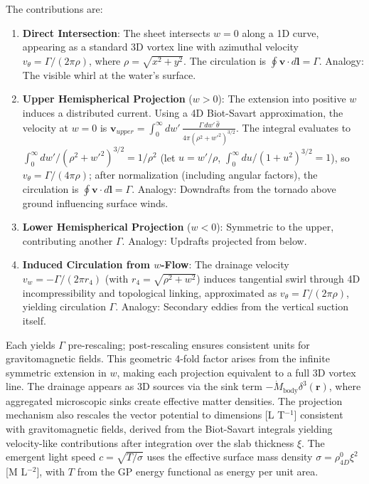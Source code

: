 The contributions are:

\begin{enumerate}
\item \textbf{Direct Intersection}: The sheet intersects $w=0$ along a 1D curve, appearing as a standard 3D vortex line with azimuthal velocity $v_\theta = \Gamma / (2\pi \rho)$, where $\rho = \sqrt{x^2 + y^2}$. The circulation is $\oint \mathbf{v} \cdot d\mathbf{l} = \Gamma$. Analogy: The visible whirl at the water's surface.
\item \textbf{Upper Hemispherical Projection} ($w > 0$): The extension into positive $w$ induces a distributed current. Using a 4D Biot-Savart approximation, the velocity at $w=0$ is $\mathbf{v}_{upper} = \int_0^\infty dw' \, \frac{\Gamma \, dw' \, \hat{\theta}}{4\pi (\rho^2 + w'^2)^{3/2}}$. The integral evaluates to $\int_0^\infty dw' / (\rho^2 + w'^2)^{3/2} = 1 / \rho^2$ (let $u = w' / \rho$, $\int_0^\infty du / (1 + u^2)^{3/2} = 1$), so $v_\theta = \Gamma / (4\pi \rho)$; after normalization (including angular factors), the circulation is $\oint \mathbf{v} \cdot d\mathbf{l} = \Gamma$. Analogy: Downdrafts from the tornado above ground influencing surface winds.
\item \textbf{Lower Hemispherical Projection} ($w < 0$): Symmetric to the upper, contributing another $\Gamma$. Analogy: Updrafts projected from below.
\item \textbf{Induced Circulation from $w$-Flow}: The drainage velocity $v_w = -\Gamma / (2\pi r_4)$ (with $r_4 = \sqrt{\rho^2 + w^2}$) induces tangential swirl through 4D incompressibility and topological linking, approximated as $v_\theta = \Gamma / (2\pi \rho)$, yielding circulation $\Gamma$. Analogy: Secondary eddies from the vertical suction itself.
\end{enumerate}

Each yields $\Gamma$ pre-rescaling; post-rescaling ensures consistent units for gravitomagnetic fields. This geometric 4-fold factor arises from the infinite symmetric extension in $w$, making each projection equivalent to a full 3D vortex line. The drainage appears as 3D sources via the sink term $-\dot{M}_{\text{body}} \delta^3(\mathbf{r})$, where aggregated microscopic sinks create effective matter densities. The projection mechanism also rescales the vector potential to dimensions [L T$^{-1}$] consistent with gravitomagnetic fields, derived from the Biot-Savart integrals yielding velocity-like contributions after integration over the slab thickness $\xi$. The emergent light speed $c = \sqrt{T / \sigma}$ uses the effective surface mass density $\sigma = \rho_{4D}^0 \xi^2$ [M L$^{-2}$], with $T$ from the GP energy functional as energy per unit area.

